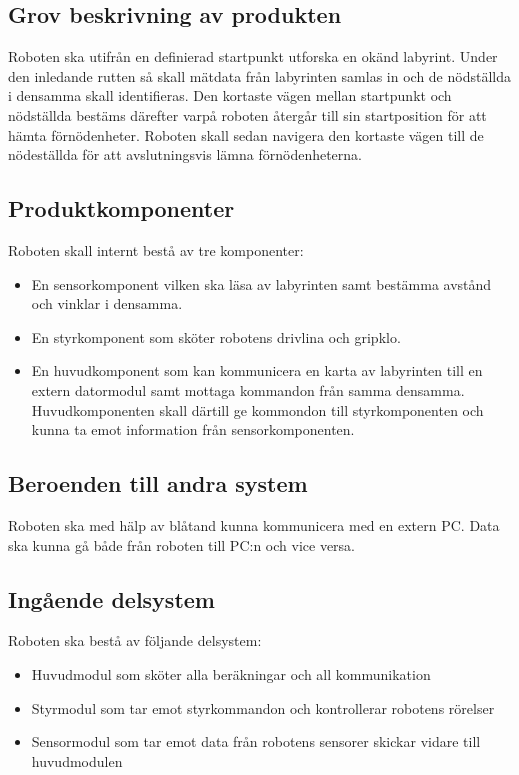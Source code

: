 \documentclass[11pt]{article}
\begin{document}
\begin{flushleft}
\subsection{Grov beskrivning av produkten}

Roboten ska utifrån en definierad startpunkt utforska en okänd labyrint. Under den inledande rutten så skall mätdata från labyrinten samlas in och de nödställda i densamma skall identifieras. Den kortaste vägen mellan startpunkt och nödställda bestäms därefter varpå roboten återgår till sin startposition för att hämta förnödenheter. Roboten skall sedan navigera den kortaste vägen till de nödeställda för att avslutningsvis lämna förnödenheterna.

\subsection{Produktkomponenter}

Roboten skall internt bestå av tre komponenter:
\begin{itemize}
\item{En sensorkomponent vilken ska läsa av labyrinten samt bestämma avstånd och vinklar i densamma.} 
\item{En styrkomponent som sköter robotens drivlina och gripklo.}
\item{En huvudkomponent som kan kommunicera en karta av labyrinten till en extern datormodul samt mottaga kommandon från samma densamma. Huvudkomponenten skall därtill ge kommondon till styrkomponenten och kunna ta emot information från sensorkomponenten.}  
\end{itemize}  


\subsection{Beroenden till andra system}

Roboten ska med hälp av blåtand kunna kommunicera med en extern PC. Data ska kunna gå både från roboten till PC:n och vice versa.

\subsection{Ingående delsystem}
Roboten ska bestå av följande delsystem:
\begin{itemize}
	\item Huvudmodul som sköter alla beräkningar och all kommunikation
	\item Styrmodul som tar emot styrkommandon och kontrollerar robotens rörelser
	\item Sensormodul som tar emot data från robotens sensorer skickar vidare till huvudmodulen
\end{itemize}


\end{flushleft}
\end{document}
